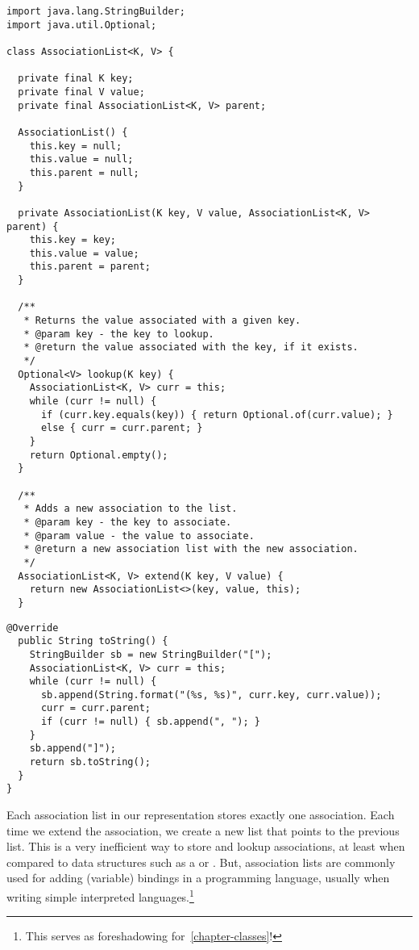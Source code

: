 \newpage %
\begin{lstlisting}[language=MyJava]
import java.lang.StringBuilder;
import java.util.Optional;

class AssociationList<K, V> {
  
  private final K key;
  private final V value;
  private final AssociationList<K, V> parent;
  
  AssociationList() {
    this.key = null;
    this.value = null;
    this.parent = null;
  }

  private AssociationList(K key, V value, AssociationList<K, V> parent) {
    this.key = key;
    this.value = value;
    this.parent = parent;
  }
  
  /**
   * Returns the value associated with a given key.
   * @param key - the key to lookup.
   * @return the value associated with the key, if it exists.
   */
  Optional<V> lookup(K key) {
    AssociationList<K, V> curr = this;
    while (curr != null) {
      if (curr.key.equals(key)) { return Optional.of(curr.value); } 
      else { curr = curr.parent; }
    }
    return Optional.empty();
  }
  
  /**
   * Adds a new association to the list.
   * @param key - the key to associate.
   * @param value - the value to associate.
   * @return a new association list with the new association.
   */
  AssociationList<K, V> extend(K key, V value) {
    return new AssociationList<>(key, value, this);
  }
\end{lstlisting}
\begin{lstlisting}[language=MyJava]
  @Override
  public String toString() {
    StringBuilder sb = new StringBuilder("[");
    AssociationList<K, V> curr = this;
    while (curr != null) {
      sb.append(String.format("(%s, %s)", curr.key, curr.value));
      curr = curr.parent;
      if (curr != null) { sb.append(", "); }
    }
    sb.append("]");
    return sb.toString();
  }
}
\end{lstlisting}
Each association list in our representation stores exactly one association. 
Each time we extend the association, we create a new list that points to the previous list. 
This is a very inefficient way to store and lookup associations, at least when compared to data structures such as a  or . But, association lists are commonly used for adding (variable) bindings in a programming language, usually when writing simple interpreted languages.\footnote{This serves as foreshadowing for~\cref{chapter-classes}!}

